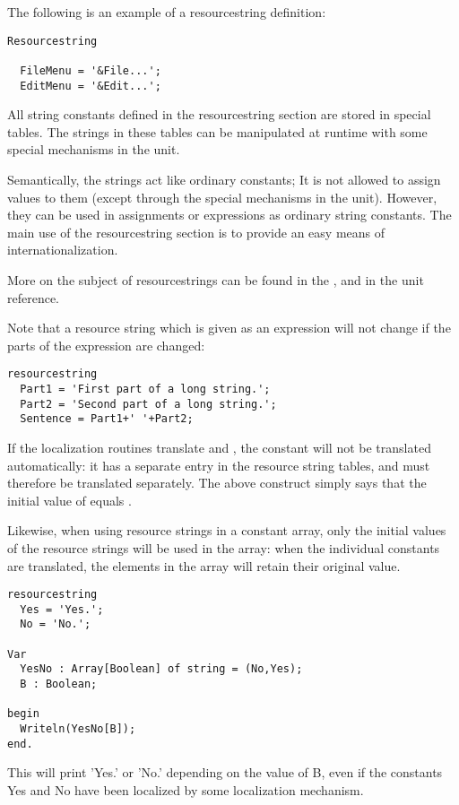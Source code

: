 The following is an example of a resourcestring definition:
\begin{verbatim}
Resourcestring

  FileMenu = '&File...';
  EditMenu = '&Edit...';
\end{verbatim}
All string constants defined in the resourcestring section are stored
in special tables. The strings in these tables can be manipulated
at runtime with some special mechanisms in the  unit.

Semantically, the strings act like ordinary constants; It is not allowed
to assign values to them (except through the special mechanisms in the 
 unit). However, they can be used in assignments or expressions as 
ordinary string constants. The main use of the resourcestring section is 
to provide an easy means of internationalization.

More on the subject of resourcestrings can be found in the \progref, and
in the  unit reference.

\begin{remark}
Note that a resource string which is given as an expression will not change if
the parts of the expression are changed:
\begin{verbatim}
resourcestring
  Part1 = 'First part of a long string.';
  Part2 = 'Second part of a long string.';
  Sentence = Part1+' '+Part2;
\end{verbatim}
If the localization routines translate  and , the
 constant will not be translated automatically: it has a
separate entry in the resource string tables, and must therefore be
translated separately. The above construct simply says that the 
initial value of  equals .
\end{remark}

\begin{remark}
Likewise, when using resource strings in a constant array, only the initial
values of the resource strings will be used in the array: when the
individual constants are translated, the elements in the array will retain
their original value.
\begin{verbatim}
resourcestring
  Yes = 'Yes.';
  No = 'No.';

Var
  YesNo : Array[Boolean] of string = (No,Yes);
  B : Boolean;

begin
  Writeln(YesNo[B]);
end.
\end{verbatim}
This will print 'Yes.' or 'No.' depending on the value of B, even if the 
constants Yes and No have been localized by some localization mechanism.
\end{remark}

